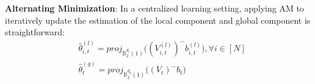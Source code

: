 \noindent \textbf{Alternating Minimization}:
In a centralized learning setting, applying AM to iteratively update the estimation of the local component and global component is straightforward:
\begin{equation}\label{eq:centralized_AM}
\begin{split}
    &\hat{\theta}^{(l)}_{i,t} = \textit{proj}_{\mathbb{B}_{2}^{d_{i}}(1)} \bigl(({V}^{(l)}_{i,t})^{-}{b}^{(l)}_{i,t} \bigr), \forall i \in [N]  \\
    &\hat{\theta}^{(g)}_{t} = \textit{proj}_{\mathbb{B}_{2}^{d_{g}}(1)}\bigl(({V}_{t})^{-}{b}_{t}\bigr) 
\end{split}
\end{equation}
